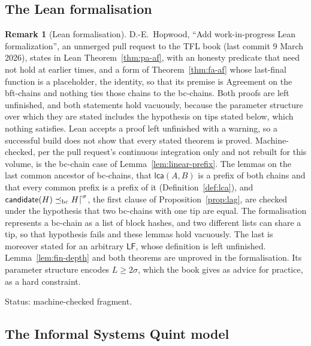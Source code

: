 \documentclass[11pt,a4paper]{article}
\theoremstyle{definition}
\newtheorem{remark}[theorem]{Remark}
\newcommand{\bc}{\mathrm{bc}}
\newcommand{\preceqbc}{\preceq_{\bc}}
\newcommand{\lca}{\mathsf{lca}}
\newcommand{\LF}{\mathsf{LF}}
\newcommand{\candidate}{\mathsf{candidate}}
\begin{document}
\subsection{The Lean formalisation}\label{sec:mc-lean}

\begin{remark}[Lean formalisation]\label{rem:mc-lean}
D.-E.~Hopwood, ``Add work-in-progress Lean formalization'', an unmerged pull
request to the TFL book (last commit 9 March 2026), states in Lean
Theorem~\ref{thm:pa-af}, with an honesty predicate that need not hold at
earlier times, and a form of Theorem~\ref{thm:fa-af} whose last-final
function is a placeholder, the identity, so that its premise is Agreement on
the bft-chains and nothing ties those chains to the bc-chains. Both proofs
are left unfinished, and both statements hold vacuously, because the
parameter structure over which they are stated includes the hypothesis on
tips stated below, which nothing satisfies. Lean accepts a proof left
unfinished with a warning, so a successful build does not show that every
stated theorem is proved. Machine-checked, per the pull request's continuous
integration only and not rebuilt for this volume, is the bc-chain case of
Lemma~\ref{lem:linear-prefix}. The lemmas on the last common ancestor of
bc-chains, that $\lca(A, B)$ is a prefix of both chains and that every
common prefix is a prefix of it (Definition~\ref{def:lca}), and
$\candidate(H) \preceqbc H\trunc{\sigma}$, the first clause of
Proposition~\ref{prop:lag}, are checked under the hypothesis that two
bc-chains with one tip are equal. The formalisation represents a bc-chain as
a list of block hashes, and two different lists can share a tip, so that
hypothesis fails and these lemmas hold vacuously. The last is moreover
stated for an arbitrary $\LF$, whose definition is left unfinished.
Lemma~\ref{lem:fin-depth} and both theorems are unproved in the
formalisation. Its parameter structure encodes $L \ge 2\sigma$, which the
book gives as advice for practice, as a hard constraint.

Status: machine-checked fragment.
\end{remark}

\subsection{The Informal Systems Quint model}\label{sec:mc-isq}
\end{document}
